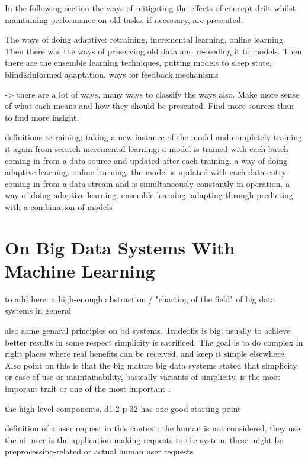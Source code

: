 In the following section the ways of mitigating the effects of concept drift whilst maintaining performance on old tasks, if necessary, are presented.

The ways of doing adaptive: retraining, incremental learning, online learning. Then there was the ways of preserving old data and re-feeding it to models. Then there are the ensemble learning techniques, putting models to sleep state, blind&informed adaptation, ways for feedback mechanisms

-> there are a lot of ways, many ways to classify the ways also. Make more sense of what each means and how they should be presented. Find more sources than \cite{conceptdriftsurvey} to find more insight.

definitions
 retraining: taking a new instance of the model and completely training it again from scratch
	    incremental learning: a model is trained with each batch coming in from a data source and updated after each training. a way of doing adaptive learning.
	    online learning: the model is updated with each data entry coming in from a data stream and is simultaneously constantly in operation. a way of doing adaptive learning.
	    ensemble learning: adapting through predicting with a combination of models

\section{On Big Data Systems With Machine Learning}


to add here: a high-enough abstraction / "charting of the field" of big data systems in general

also some genaral principles on bd systems. Tradeoffs is big: usually to achieve better results in some respect simplicity is sacrificed. The goal is to do complex in right places where real benefits can be received, and keep it simple elsewhere. Also point on this is that the big mature big data systems stated that simplicity or ease of use or maintainability, basically variants of simplicity, is the most imporant trait or one of the most important \cite{facebook} \cite{storm@twitter}.

the high level components, d1.2 p 32 has one good starting point

definition of a user request in this context: the human is not considered, they use the ui. user is the application making requests to the system. these might be preprocessing-related or actual human user requests

